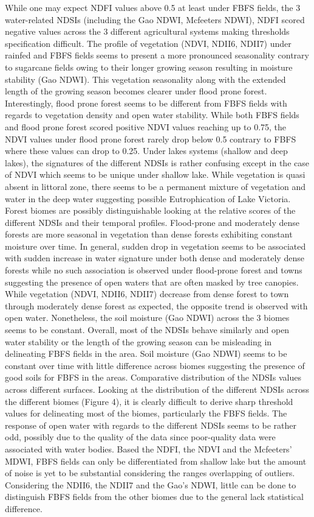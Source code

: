 \documentclass[12pt,oneside]{article}
\begin{document}
While one may expect NDFI values above 0.5 at least under FBFS fields,
the 3 water-related NDSIs (including the Gao NDWI, Mcfeeters NDWI), NDFI
scored negative values across the 3 different agricultural systems
making thresholds specification difficult. The profile of vegetation
(NDVI, NDII6, NDII7) under rainfed and FBFS fields seems to present a
more pronounced seasonality contrary to sugarcane fields owing to their
longer growing season resulting in moisture stability (Gao NDWI). This
vegetation seasonality along with the extended length of the growing
season becomes clearer under flood prone forest. Interestingly, flood
prone forest seems to be different from FBFS fields with regards to
vegetation density and open water stability. While both FBFS fields and
flood prone forest scored positive NDVI values reaching up to 0.75, the
NDVI values under flood prone forest rarely drop below 0.5 contrary to
FBFS where these values can drop to 0.25. Under lakes systems (shallow
and deep lakes), the signatures of the different NDSIs is rather
confusing except in the case of NDVI which seems to be unique under
shallow lake. While vegetation is quasi absent in littoral zone, there
seems to be a permanent mixture of vegetation and water in the deep
water suggesting possible Eutrophication of Lake Victoria. Forest biomes
are possibly distinguishable looking at the relative scores of the
different NDSIs and their temporal profiles. Flood-prone and moderately
dense forests are more seasonal in vegetation than dense forests
exhibiting constant moisture over time. In general, sudden drop in
vegetation seems to be associated with sudden increase in water
signature under both dense and moderately dense forests while no such
association is observed under flood-prone forest and towns suggesting
the presence of open waters that are often masked by tree canopies.
While vegetation (NDVI, NDII6, NDII7) decrease from dense forest to town
through moderately dense forest as expected, the opposite trend is
observed with open water. Nonetheless, the soil moisture (Gao NDWI)
across the 3 biomes seems to be constant. Overall, most of the NDSIs
behave similarly and open water stability or the length of the growing
season can be misleading in delineating FBFS fields in the area. Soil
moisture (Gao NDWI) seems to be constant over time with little
difference across biomes suggesting the presence of good soils for FBFS
in the areas. Comparative distribution of the NDSIs values across
different surfaces. Looking at the distribution of the different NDSIs
across the different biomes (Figure 4), it is clearly difficult to
derive sharp threshold values for delineating most of the biomes,
particularly the FBFS fields. The response of open water with regards to
the different NDSIs seems to be rather odd, possibly due to the quality
of the data since poor-quality data were associated with water bodies.
Based the NDFI, the NDVI and the Mcfeeters' MDWI, FBFS fields can only
be differentiated from shallow lake but the amount of noise is yet to be
substantial considering the ranges overlapping of outliers. Considering
the NDII6, the NDII7 and the Gao's NDWI, little can be done to
distinguish FBFS fields from the other biomes due to the general lack
statistical difference.
\end{document}
